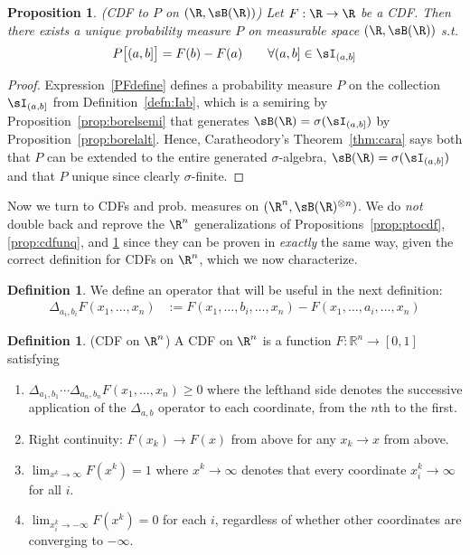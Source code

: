 \documentclass[12pt]{article}
\theoremstyle{plain}
\newtheorem{prop}[thm]{Proposition}
\theoremstyle{definition}
\newtheorem{defn}[thm]{Definition}
\theoremstyle{remark}
\newcommand{\ra}{\rightarrow}
\newcommand{\Rn}{\mathbb{R}^n}
\begin{document}
\begin{prop}\emph{(CDF to $P$ on $(\R,\sB(\R))$)}
\label{prop:cdftop}
Let $F:\R\ra\R$ be a CDF. Then there \emph{exists a unique} probability
measure $P$ on measurable space $(\R,\sB(\R))$ s.t.
\begin{align}
  P\big[(a,b]\big] = F(b)-F(a)
  \qquad \forall (a,b]\in\sI_{(a,b]}
  \label{PFdefine}
\end{align}
\end{prop}
\begin{proof}
Expression~\ref{PFdefine} defines a probability measure $P$ on the
collection $\sI_{(a,b]}$ from Definition~\ref{defn:Iab}, which is a
semiring by Proposition~\ref{prop:borelsemi} that generates
$\sB(\R)=\sigma(\sI_{(a,b]})$ by Proposition~\ref{prop:borelalt}.
Hence, Caratheodory's Theorem~\ref{thm:cara} says both that $P$ can be
extended to the entire generated $\sigma$-algebra,
$\sB(\R)=\sigma(\sI_{(a,b]})$ and that $P$ unique since clearly
$\sigma$-finite.
\end{proof}



Now we turn to CDFs and prob. measures on
$(\R^n,\sB(\R)^{\otimes n})$. We do \emph{not} double back and reprove
the $\R^n$ generalizations of Propositions~\ref{prop:ptocdf},
\ref{prop:cdfunq}, and \ref{prop:cdftop} since they can be proven in
\emph{exactly} the same way, given the correct definition for CDFs on
$\R^n$, which we now characterize.

\begin{defn}
We define an operator that will be useful in the next definition:
\begin{align*}
  \Delta_{a_i,b_i} F(x_1,\ldots,x_n)
  &:= F(x_1,\ldots,b_i,\ldots,x_n)
  - F(x_1,\ldots,a_i,\ldots,x_n)
\end{align*}
\end{defn}

\clearpage
\begin{defn}(CDF on $\R^n$)
\label{defn:F}
A CDF on $\R^n$ is a function $F:\Rn\ra[0,1]$ satisfying
\begin{enumerate}
  \item
    $\Delta_{a_1,b_1} \cdots
    \Delta_{a_n,b_n}
    F(x_1,\ldots,x_n) \geq 0$
    where the lefthand side denotes the successive application of the
    $\Delta_{a,b}$ operator to each coordinate, from the $n$th to the
    first.

  \item Right continuity: $F(x_k) \ra F(x)$ from above for any
    $x_k \ra x$ from above.

  \item $\lim_{x^k \ra \infty} F(x^k)=1$ where $x^k\ra \infty$ denotes
    that every coordinate $x^k_i \ra \infty$ for all $i$.

  \item $\lim_{x^k_i\ra-\infty} F(x^k) = 0$ for each $i$,
    regardless of whether other coordinates are converging to
    $-\infty$.
\end{enumerate}
\end{defn}
\end{document}
